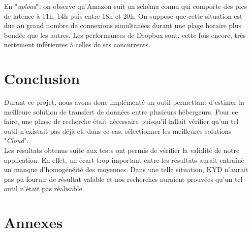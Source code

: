 \documentclass[10pt]{article}
\begin{document}
En "\textit{upload}", on observe qu'Amazon suit un schéma connu qui comporte des pics de latence à 11h, 14h puis entre 18h et 20h. On suppose que cette situation est due au grand nombre de connexions simultanées durant une plage horaire plus bondée que les autres. Les performances de Dropbox sont, cette fois encore, très nettement inférieures à celles de ses concurrents.



\section{Conclusion}

Durant ce projet, nous avons donc implémenté un outil permettant d'estimer la meilleure solution de transfert de données entre plusieurs hébergeurs. Pour ce faire, une phase de recherche était nécessaire puisqu'il fallait vérifier qu'un tel outil n'existait pas déjà et, dans ce cas, sélectionner les meilleures solutions "\textit{Cloud}".\\

Les résultats obtenus suite aux tests ont permis de vérifier la validité de notre application. En effet, un écart trop important entre les résultats aurait entraîné un manque d'homogénéité des moyennes. Dans une telle situation, KYD n'aurait pas pu fournir de résultat valable et nos recherches auraient prouvées qu'un tel outil n'était pas réalisable.\\

\section{Annexes}
\end{document}
